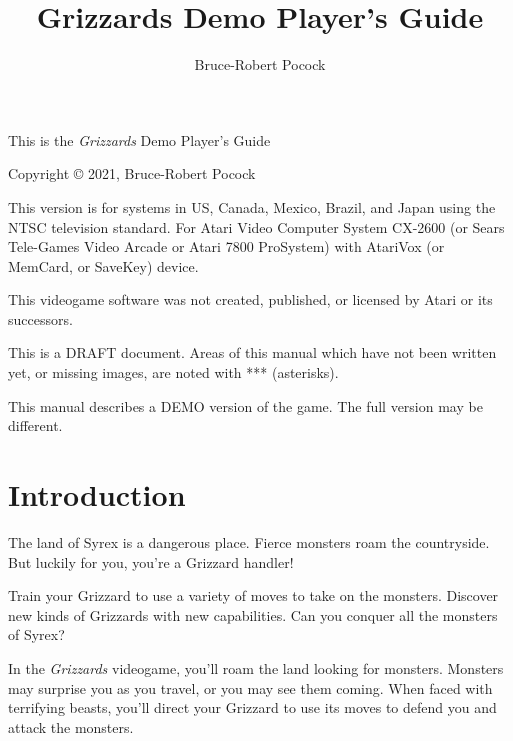 \documentclass[12pt,openright,book]{memoir}
\title{Grizzards \ifdefined\DEMO Demo \fi Player's Guide}
\author{Bruce-Robert Pocock}
\makeatletter
\newcommand\TV{NTSC}
\newcommand\REGION{US, Canada, Mexico, Brazil, and Japan}
\newcommand\TV{PAL}
\newcommand\REGION{UK and Europe (except France)}
\newcommand\TV{SECAM}
\newcommand\REGION{France, Russia, Africa}
\def\maketitle{%
  \null
  \thispagestyle{empty}%
  \vfill
  \begin{center}\leavevmode
    \normalfont
    {\LARGE\raggedleft \@author\par}%
    \hrulefill\par
    {\huge\raggedright \@title\par}%
    \vskip 1cm
  \end{center}%
  \vfill
  \null
  \cleardoublepage
  }
\makeatother
\begin{document}


\maketitle

\frontmatter

\null\vfill

\begin{flushleft}
This is the \textit{Grizzards} \ifdefined\DEMO Demo \fi Player's Guide

Copyright \copyright{} 2021, Bruce-Robert Pocock

\bigskip

This  version is  for systems  in \REGION{}  using the  \TV{} television
standard. For Atari  Video Computer System CX-2600  (or Sears Tele-Games
Video  Arcade or  Atari 7800  ProSystem) with  AtariVox (or  MemCard, or
SaveKey) device.

\bigskip

This videogame software was not created, published, or licensed by Atari
or its successors.

\bigskip

This  is a  DRAFT document.  Areas of  this manual  which have  not been
written yet, or missing images, are noted with *** (asterisks).

\ifdefined\DEMO
This manual describes  a DEMO version of the game.  The full version may
be different.
\fi

\end{flushleft}
\let\cleardoublepage\clearpage

\mainmatter

\chapter*{Introduction}\label{Introduction}

The  land of  Syrex  is  a dangerous  place.  Fierce  monsters roam  the
countryside. But luckily for you, you're a Grizzard handler!

Train your Grizzard to  use a variety of moves to  take on the monsters.
Discover new kinds  of Grizzards with new capabilities.  Can you conquer
all the monsters of Syrex?

\bigskip

In the \textit{Grizzards}  videogame, you'll roam the land  looking for monsters.
Monsters may  surprise you as  you travel, or  you may see  them coming.
When faced  with terrifying beasts,  you'll direct your Grizzard  to use
its moves to defend you and attack the monsters.
\end{document}
